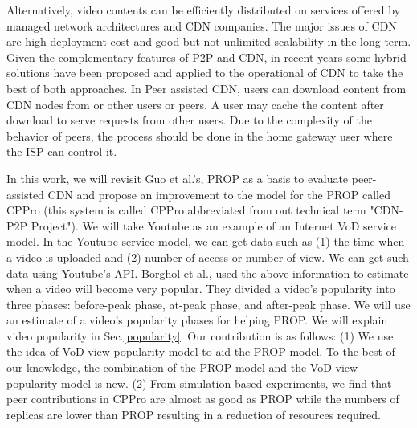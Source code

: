 \documentclass[10pt,final,journal,a4paper]{IEEEtran}
\begin{document}
Alternatively, video contents can be efficiently distributed on services offered by managed network architectures and CDN companies.
The major issues of CDN are high deployment cost and good but not unlimited scalability in the long term.  
Given the complementary features of P2P and CDN, in recent years some hybrid solutions have been proposed and applied to the operational of CDN \cite{Huang:2008:UHC:1496046.1496064,4772628,Yin:2009:DDH:1631272.1631279} to take the best of both approaches.
In Peer assisted CDN, users can download content from CDN nodes from or other users or peers. 
A user may cache the content after download to serve requests from other users. 
Due to the complexity of the behavior of peers, the process should be done in the home gateway user where the ISP can control it.

In this work, we will revisit Guo et al.'s, \cite{1613869} PROP as a basis to evaluate peer-assisted CDN and propose an improvement to the model for the PROP called CPPro (this system is called CPPro abbreviated from out technical term "CDN-P2P Project").
We will take Youtube as an example of an Internet VoD service model.
In the Youtube service model, we can get data such as (1) the time when a video is uploaded and (2) number of access or number of view.
We can get such data using Youtube's API.
Borghol et al., \cite{Borghol:2011:CMP:2039452.2039717} used the above information to estimate when a video will become very popular.
They divided a video's popularity into three phases: before-peak phase, at-peak phase, and after-peak phase.
We will use an estimate of a video's popularity phases for helping PROP.
We will explain video popularity in Sec.\ref{popularity}.
Our contribution is as follows:
(1) We use the idea of VoD view popularity model to aid the PROP model. 
To the best of our knowledge, the combination of the PROP model and the VoD view popularity model is new.
(2) From simulation-based experiments, we find that peer contributions in CPPro are almost as good as  PROP while the numbers of replicas are lower than PROP resulting in a reduction of resources required.
\end{document}
